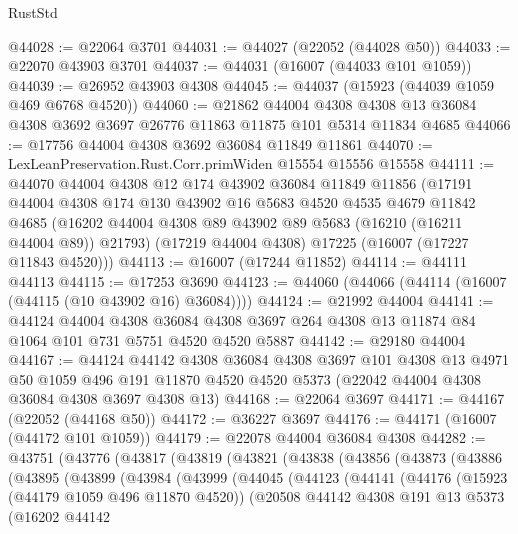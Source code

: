 \begin{lexlean}{RustStd}
\begin{coremodule}
@44028 := @22064 @3701
@44031 := @44027 (@22052 (@44028 @50))
@44033 := @22070 @43903 @3701
@44037 := @44031 (@16007 (@44033 @101 @1059))
@44039 := @26952 @43903 @4308
@44045 := @44037 (@15923 (@44039 @1059 @469 @6768 @4520))
@44060 := @21862
    @44004
    @4308
    @4308
    @13
    @36084
    @4308
    @3692
    @3697
    @26776
    @11863
    @11875
    @101
    @5314
    @11834
    @4685
@44066 := @17756 @44004 @4308 @3692 @36084 @11849 @11861
@44070 := LexLeanPreservation.Rust.Corr.primWiden @15554 @15556 @15558
@44111 := @44070
    @44004
    @4308
    @12
    @174
    @43902
    @36084
    @11849
    @11856
    (@17191
      @44004
      @4308
      @174
      @130
      @43902
      @16
      @5683
      @4520
      @4535
      @4679
      @11842
      @4685
      (@16202 @44004 @4308 @89 @43902 @89 @5683 (@16210 (@16211 @44004 @89)) @21793)
      (@17219 @44004 @4308)
      @17225
      (@16007 (@17227 @11843 @4520)))
@44113 := @16007 (@17244 @11852)
@44114 := @44111 @44113
@44115 := @17253 @3690
@44123 := @44060 (@44066 (@44114 (@16007 (@44115 (@10 @43902 @16) @36084))))
@44124 := @21992 @44004
@44141 := @44124
    @44004
    @4308
    @36084
    @4308
    @3697
    @264
    @4308
    @13
    @11874
    @84
    @1064
    @101
    @731
    @5751
    @4520
    @4520
    @5887
@44142 := @29180 @44004
@44167 := @44124
    @44142
    @4308
    @36084
    @4308
    @3697
    @101
    @4308
    @13
    @4971
    @50
    @1059
    @496
    @191
    @11870
    @4520
    @4520
    @5373
    (@22042 @44004 @4308 @36084 @4308 @3697 @4308 @13)
@44168 := @22064 @3697
@44171 := @44167 (@22052 (@44168 @50))
@44172 := @36227 @3697
@44176 := @44171 (@16007 (@44172 @101 @1059))
@44179 := @22078 @44004 @36084 @4308
@44282 := @43751
    (@43776
      (@43817
        (@43819
          (@43821
            (@43838
              (@43856
                (@43873
                  (@43886
                    (@43895
                      (@43899
                        (@43984
                          (@43999
                            (@44045
                              (@44123
                                (@44141
                                  (@44176
                                    (@15923 (@44179 @1059 @496 @11870 @4520))
                                    (@20508
                                      @44142
                                      @4308
                                      @191
                                      @13
                                      @5373
                                      (@16202
                                        @44142

\end{coremodule}
\end{lexlean}
